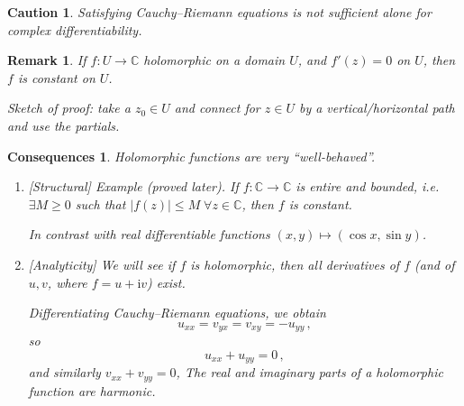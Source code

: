 \documentclass{article}
\theoremstyle{plain}\theoremheaderfont{\normalfont\itshape}\theorembodyfont{\rmfamily}\theoremseparator{.}\newtheorem*{rem}{Remark}\newtheorem*{ex}{Example}\newtheorem*{proof}{Proof}\newtheorem*{altp}{Alternative proof}\newtheorem*{con}{Consequences}\newtheorem*{notn}{Notations}\newtheorem*{cau}{Caution}\newtheorem*{term}{Terminology}\newtheorem*{keyex}{Key example}
\theoremstyle{plain}\theoremheaderfont{\normalfont\bfseries}\theorembodyfont{\rmfamily}\theoremseparator{.}\newtheorem{thm}{Theorem}[section]\newtheorem{lem}[thm]{Lemma}\newtheorem{prop}[thm]{Proposition}\newtheorem*{cor}{Corollary}\newtheorem{defn}[thm]{Definition}\newtheorem{clm}[thm]{Claim}\newtheorem{clminproof}{Claim}\newtheorem{leminproof}{Lemma}\newtheorem{app}{Application}
\theoremstyle{break}\theoremheaderfont{\normalfont\itshape}\theorembodyfont{\rmfamily}\theoremseparator{.\medskip}\newtheorem*{proofskip}{Proof}\newtheorem*{exs}{Examples}\newtheorem*{rems}{Remarks}\newtheorem*{rec}{Recall}\newtheorem*{ppts}{Properties}
\theoremstyle{break}\theoremheaderfont{\normalfont\bfseries}\theorembodyfont{\rmfamily}\theoremseparator{.\medskip}\newtheorem{lemskip}[thm]{Lemma}\newtheorem{defnskip}[thm]{Definition}\newtheorem{propskip}[thm]{Proposition}\newtheorem{thmskip}[thm]{Theorem}
\numberwithin{equation}{section}
\newcommand{\ii}{\mathrm{i}}
\newcommand{\abs}[1]{\left|#1\right|}
\newcommand{\CC}{\mathbb{C}}
\begin{document}
    \begin{cau}
        Satisfying Cauchy--Riemann equations is not sufficient alone for complex differentiability.
    \end{cau}
    \begin{rem}
        If \(f:U\to\mathbb{C}\) holomorphic on a domain \(U\), and \(f'(z)=0\) on \(U\), then \(f\) is constant on \(U\).

        Sketch of proof: take a \(z_0\in U\) and connect for \(z\in U\) by a vertical/horizontal path and use the partials. 
    \end{rem}
    \begin{con}
        Holomorphic functions are very ``well-behaved''.
        \begin{enumerate}[topsep=0pt,label=(\roman*)]
            \item {[Structural]} \textit{Example} (proved later). If \(f:\CC\to\CC\) is entire and bounded, i.e. \(\exists M\ge 0\) such that \(\abs{f(z)}\le M\; \forall z\in\CC\), then \(f\) is constant.
            
            In contrast with real differentiable functions \((x,y)\mapsto(\cos x,\sin y)\).
            \item {[Analyticity]} We will see if \(f\) is holomorphic, then all derivatives of \(f\) (and of \(u,v\), where \(f=u+\ii v\)) exist.
            
            Differentiating Cauchy--Riemann equations, we obtain
            \[u_{xx}=v_{yx}=v_{xy}=-u_{yy}\,,\]
            so
            \[u_{xx}+u_{yy}=0\,,\]
            and similarly \(v_{xx}+v_{yy}=0\), The real and imaginary parts of a holomorphic function are harmonic.
        \end{enumerate}
    \end{con}
    
\end{document}
